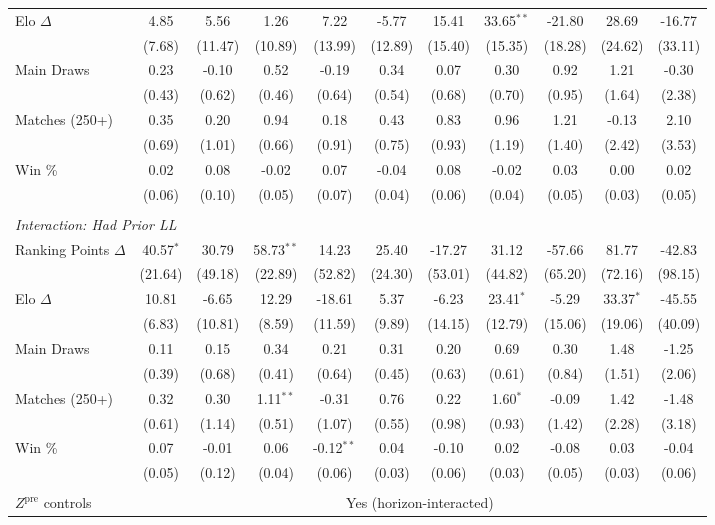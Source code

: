 \begin{tabular}{lcccccccccc}
\quad Elo $\Delta$ & 4.85 & 5.56 & 1.26 & 7.22 & -5.77 & 15.41 & 33.65$^{**}$ & -21.80 & 28.69 & -16.77 \\
 & (7.68) & (11.47) & (10.89) & (13.99) & (12.89) & (15.40) & (15.35) & (18.28) & (24.62) & (33.11) \\[0.3em]
\quad Main Draws & 0.23 & -0.10 & 0.52 & -0.19 & 0.34 & 0.07 & 0.30 & 0.92 & 1.21 & -0.30 \\
 & (0.43) & (0.62) & (0.46) & (0.64) & (0.54) & (0.68) & (0.70) & (0.95) & (1.64) & (2.38) \\[0.3em]
\quad Matches (250+) & 0.35 & 0.20 & 0.94 & 0.18 & 0.43 & 0.83 & 0.96 & 1.21 & -0.13 & 2.10 \\
 & (0.69) & (1.01) & (0.66) & (0.91) & (0.75) & (0.93) & (1.19) & (1.40) & (2.42) & (3.53) \\[0.3em]
\quad Win \% & 0.02 & 0.08 & -0.02 & 0.07 & -0.04 & 0.08 & -0.02 & 0.03 & 0.00 & 0.02 \\
 & (0.06) & (0.10) & (0.05) & (0.07) & (0.04) & (0.06) & (0.04) & (0.05) & (0.03) & (0.05) \\[0.3em]
\\[0.3em]
\multicolumn{11}{l}{\textit{Interaction: Had Prior LL}} \\
\quad Ranking Points $\Delta$ & 40.57$^{*}$ & 30.79 & 58.73$^{**}$ & 14.23 & 25.40 & -17.27 & 31.12 & -57.66 & 81.77 & -42.83 \\
 & (21.64) & (49.18) & (22.89) & (52.82) & (24.30) & (53.01) & (44.82) & (65.20) & (72.16) & (98.15) \\[0.3em]
\quad Elo $\Delta$ & 10.81 & -6.65 & 12.29 & -18.61 & 5.37 & -6.23 & 23.41$^{*}$ & -5.29 & 33.37$^{*}$ & -45.55 \\
 & (6.83) & (10.81) & (8.59) & (11.59) & (9.89) & (14.15) & (12.79) & (15.06) & (19.06) & (40.09) \\[0.3em]
\quad Main Draws & 0.11 & 0.15 & 0.34 & 0.21 & 0.31 & 0.20 & 0.69 & 0.30 & 1.48 & -1.25 \\
 & (0.39) & (0.68) & (0.41) & (0.64) & (0.45) & (0.63) & (0.61) & (0.84) & (1.51) & (2.06) \\[0.3em]
\quad Matches (250+) & 0.32 & 0.30 & 1.11$^{**}$ & -0.31 & 0.76 & 0.22 & 1.60$^{*}$ & -0.09 & 1.42 & -1.48 \\
 & (0.61) & (1.14) & (0.51) & (1.07) & (0.55) & (0.98) & (0.93) & (1.42) & (2.28) & (3.18) \\[0.3em]
\quad Win \% & 0.07 & -0.01 & 0.06 & -0.12$^{**}$ & 0.04 & -0.10 & 0.02 & -0.08 & 0.03 & -0.04 \\
 & (0.05) & (0.12) & (0.04) & (0.06) & (0.03) & (0.06) & (0.03) & (0.05) & (0.03) & (0.06) \\[0.3em]
\\[0.3em]
\midrule
$Z^{\text{pre}}$ controls & \multicolumn{10}{c}{Yes (horizon-interacted)} \\
\bottomrule
\end{tabular}
